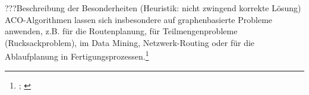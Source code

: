???Beschreibung der Besonderheiten (Heuristik: nicht zwingend korrekte Lösung) \\

\noindent
ACO-Algorithmen lassen sich insbesondere auf graphenbasierte Probleme anwenden, z.B. für die Routenplanung, für Teilmengenprobleme (Rucksackproblem), im Data Mining, Netzwerk-Routing oder für die Ablaufplanung in Fertigungsprozessen.\footnote{\cite[Vgl.][S. 15ff.]{sch-koa}; \cite[vgl.][]{wiki-antalg}} \\



\vspace*{1cm}
